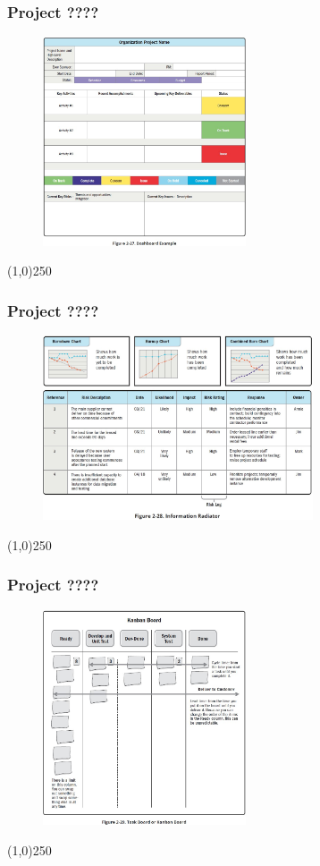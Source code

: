 \begin{frame}
\frametitle{Project ????}
 \begin{figure}
    \centering
        \includegraphics[width = 6cm]{../images/guide/Fig2-27.jpg}
    \label{guidefig:2-27}
 \end{figure}
\end{frame}
\begin{center}\line(1,0){250}\end{center}

\begin{frame}
\frametitle{Project ????}
 \begin{figure}
    \centering
        \includegraphics[width = 8cm]{../images/guide/Fig2-28.jpg}
    \label{guidefig:2-28}
 \end{figure}
\end{frame}
\begin{center}\line(1,0){250}\end{center}

\begin{frame}
\frametitle{Project ????}
 \begin{figure}
    \centering
        \includegraphics[width = 6cm]{../images/guide/Fig2-29.jpg}
    \label{guidefig:2-29}
 \end{figure}
\end{frame}
\begin{center}\line(1,0){250}\end{center}


